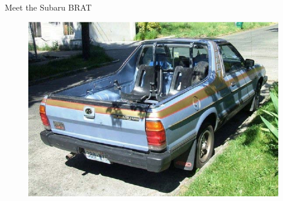 \documentclass[10pt,hyperref={CJKbookmarks=true},xcolor=dvipsnames,aspectratio=169]{beamer}
\begin{document}
\begin{frame}{Meet the Subaru BRAT}


\begin{figure}


\includegraphics[scale=0.4]{fig/instruments/lec07-2}

\end{figure}

\end{frame}
\end{document}
